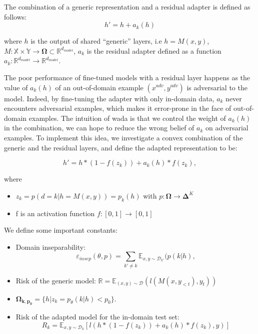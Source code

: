 \documentclass[12pt,a4paper,twoside]{report}
\theoremstyle{definition}
\newcommand{\fyTodo}[1]{\Todo[FY:]{\textcolor{orange}{#1}}}
\newcommand{\fyDone}[1]{\done[FY]\Todo[FY:]{\textcolor{orange}{#1}}}
\begin{document}
The combination of a generic representation and a residual adapter is defined as follows:
\begin{equation}
  h' = h + a_k(h) \label{eq:residual-adapter}
\end{equation}

where $h$ is the output of shared ``generic'' layers, i.e $h=M(x,y)$, $M: \mathbb{X} \times \mathbb{Y} \rightarrow \mathbf{\Omega}\subset \mathbb{R}^{d_{model}}$, $a_k$ is the residual adapter defined as a function $a_k: \mathbb{R}^{d_{model}} \rightarrow \mathbb{R}^{d_{model}}$.

The poor performance of fine-tuned models with a residual layer happens as the value of $a_k(h)$ of an out-of-domain example $(x^{adv}, y^{adv})$ is adversarial to the model. Indeed, by fine-tuning the adapter with only in-domain data, $a_k$ never encounters adversarial examples, which makes it error-prone in the face of out-of-domain examples. The intuition of wada is that we control the weight of $a_k(h)$ in the combination, we can hope to reduce the wrong belief of $a_k$ on adversarial examples. To implement this idea, we  investigate a convex combination of the generic and the residual layers, and define the adapted representation to be:

\begin{equation}
h' = h * (1-f(z_k)) + a_k(h) * f(z_k), 
\label{eq:2}
\end{equation}

\noindent{}where
\begin{itemize}
\item $z_k = p(d=k | h=M(x,y)) = p_k(h)$ with $p: \mathbf{\Omega} \rightarrow \mathbf{\Delta}^{K}$\fyTodo{Attention à $x$ et $y$}
\item f is an activation function $f: [0,1] \rightarrow [0,1]$ 
\end{itemize}

We define some important constants:
\begin{itemize}
\item Domain inseparability:  \fyTodo{Esperance de classification error - is it }
  $$
  \mathbb{\varepsilon}_{insep}(\theta, p) = \sum_{k' \neq k} \mathbb{E}_{x,y \sim \mathcal{D}_{k'}}(p(k|h),
  $$
\item Risk of the generic model: $\mathbb{R} = \mathbb{E}_{(x,y) \sim \mathcal{D}}(l(M(x,y_{<t}), y_t))$ \fyDone{wrt to which distribution ?}
\item $\mathbf{\Omega_{k,p_{0}}} = \lbrace h | z_k = p_\theta(k|h) < p_0\rbrace$.
\item Risk of the adapted model for the in-domain test set:
  $$R_k = \mathbb{E}_{x,y \sim \mathcal{D}_k} [l(h * (1 - f(z_k)) + a_k(h) * f(z_k), y)]$$
\end{itemize}
\end{document}
